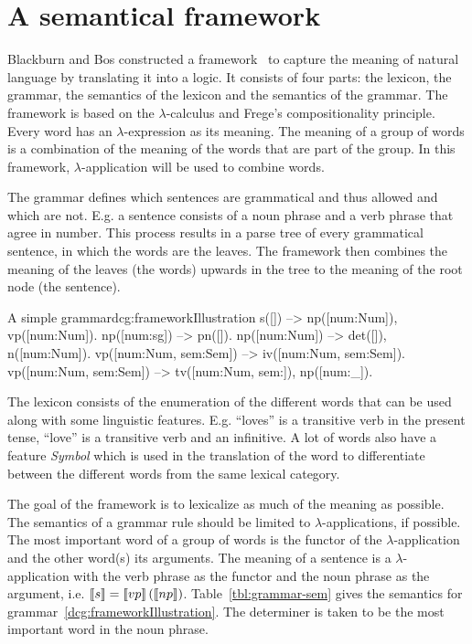 \section{A semantical framework}
Blackburn and Bos constructed a framework~\cite{Blackburn2005, Blackburn2006} to capture the meaning of natural language by translating it into a logic. It consists of four parts: the lexicon, the grammar, the semantics of the lexicon and the semantics of the grammar. The framework is based on the $\lambda$-calculus and Frege's compositionality principle. Every word has an $\lambda$-expression as its meaning. The meaning of a group of words is a combination of the meaning of the words that are part of the group. In this framework, $\lambda$-application will be used to combine words.

The grammar defines which sentences are grammatical and thus allowed and which are not. E.g. a sentence consists of a noun phrase and a verb phrase that agree in number. This process results in a parse tree of every grammatical sentence, in which the words are the leaves. The framework then combines the meaning of the leaves (the words) upwards in the tree to the meaning of the root node (the sentence).

\begin{dcg}{A simple grammar}{dcg:frameworkIllustration}
s([]) -->
  np([num:Num]),
  vp([num:Num]).
np([num:sg]) -->
  pn([]).
np([num:Num]) -->
  det([]),
  n([num:Num]).
vp([num:Num, sem:Sem]) -->
  iv([num:Num, sem:Sem]).
vp([num:Num, sem:Sem]) -->
  tv([num:Num, sem:]),
  np([num:_]).
\end{dcg}

The lexicon consists of the enumeration of the different words that can be used along with some linguistic features. E.g. ``loves'' is a transitive verb in the present tense, ``love'' is a transitive verb and an infinitive. A lot of words also have a feature \textit{Symbol} which is used in the translation of the word to differentiate between the different words from the same lexical category.

The goal of the framework is to lexicalize as much of the meaning as possible. The semantics of a grammar rule should be limited to $\lambda$-applications, if possible. The most important word of a group of words is the functor of the $\lambda$-application and the other word(s) its arguments. The meaning of a sentence is a $\lambda$-application with the verb phrase as the functor and the noun phrase as the argument, i.e. $\llbracket s \rrbracket = \llbracket vp \rrbracket \left( \llbracket np \rrbracket \right)$. Table~\ref{tbl:grammar-sem} gives the semantics for grammar~\ref{dcg:frameworkIllustration}. The determiner is taken to be the most important word in the noun phrase.

